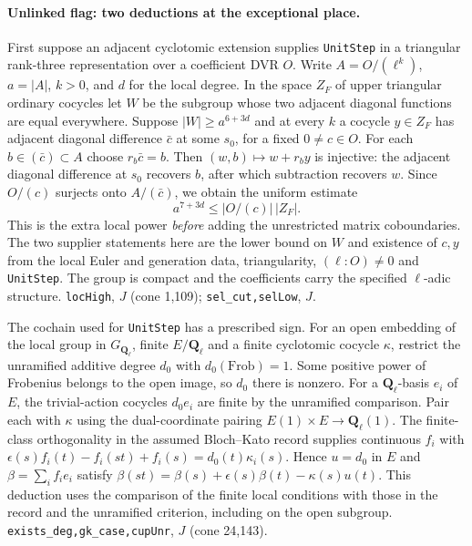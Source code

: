 \paragraph{Unlinked flag: two deductions at the exceptional place.}
First suppose an adjacent cyclotomic extension supplies
\nolinkurl{UnitStep} in a triangular rank-three representation over a
coefficient DVR $O$. Write $A=O/(\ell^k)$, $a=|A|$, $k>0$, and $d$ for
the local degree. In the space $Z_F$ of upper triangular ordinary
cocycles let $W$ be the subgroup whose two adjacent diagonal functions
are equal everywhere. Suppose $|W|\ge a^{6+3d}$ and at every $k$ a
cocycle $y\in Z_F$ has adjacent diagonal difference $\bar c$ at some
$s_0$, for a fixed $0\ne c\in O$. For each
$b\in(\bar c)\subset A$ choose $r_b\bar c=b$. Then
$(w,b)\mapsto w+r_by$ is injective: the adjacent diagonal difference
at $s_0$ recovers $b$, after which subtraction recovers $w$.
Since $O/(c)$ surjects onto $A/(\bar c)$, we obtain the uniform estimate
\[
 a^{7+3d}\le |O/(c)|\,|Z_F|.
\]
This is the extra local power \emph{before} adding the unrestricted
matrix coboundaries. The two supplier statements here are the lower bound
on $W$ and existence of $c,y$ from the local Euler and generation data,
triangularity, $(\ell:O)\ne0$ and \nolinkurl{UnitStep}. The group is
compact and the coefficients carry the specified $\ell$-adic structure.
\nolinkurl{locHigh}, $J$
(cone 1,109); \nolinkurl{sel_cut,selLow},
$J$.

The cochain used for \nolinkurl{UnitStep} has a prescribed sign. For an
open embedding of the local group in $G_{\mathbf Q_\ell}$, finite
$E/\mathbf Q_\ell$ and a finite cyclotomic cocycle $\kappa$, restrict the
unramified additive degree $d_0$ with $d_0(\mathrm{Frob})=1$. Some
positive power of Frobenius belongs to the open image, so $d_0$ there is
nonzero. For a $\mathbf Q_\ell$-basis $e_i$ of $E$, the trivial-action
cocycles $d_0e_i$ are finite by the unramified comparison. Pair each with
$\kappa$ using the dual-coordinate pairing $E(1)\times E\to\mathbf Q_\ell(1)$.
The finite-class orthogonality in the assumed Bloch--Kato record supplies
continuous $f_i$ with
$\epsilon(s)f_i(t)-f_i(st)+f_i(s)=d_0(t)\kappa_i(s)$.
Hence $u=d_0$ in $E$ and $\beta=\sum_i f_ie_i$ satisfy
$\beta(st)=\beta(s)+\epsilon(s)\beta(t)-\kappa(s)u(t)$.
This deduction uses the comparison of the finite local conditions with
those in the record and the unramified criterion, including on the
open subgroup. \nolinkurl{exists_deg,gk_case,cupUnr},
$J$
(cone 24,143).

